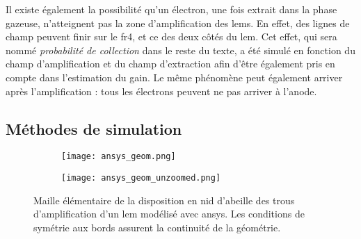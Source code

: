         Il existe également la possibilité qu'un électron, une fois extrait dans la phase gazeuse, n'atteignent pas la zone d'amplification des \glspl{lem}. En effet, des lignes de champ peuvent finir sur le \gls{fr4}, et ce des deux côtés du \gls{lem}. Cet effet, qui sera nommé \textit{probabilité de collection} dans le reste du texte, a été simulé en fonction du champ d'amplification et du champ d'extraction afin d'être également pris en compte dans l'estimation du gain. Le même phénomène peut également arriver après l'amplification : tous les électrons peuvent ne pas arriver à l'anode.
        
        \subsection{Méthodes de simulation}
        
            \begin{figure}[htpb]
                \begin{subfigure}[t]{0.48\textwidth}
                    \texttt{[image: ansys\_geom.png]}
                \end{subfigure}
                \hfill
                \begin{subfigure}[t]{0.48\textwidth}
                    \texttt{[image: ansys\_geom\_unzoomed.png]}
                \end{subfigure}
                \caption{Maille élémentaire de la disposition en nid d'abeille des trous d'amplification d'un \gls{lem} modélisé avec \gls{ansys}. Les conditions de symétrie aux bords assurent la continuité de la géométrie.}
                \label{fig::ansys_geom}
            \end{figure}
            

